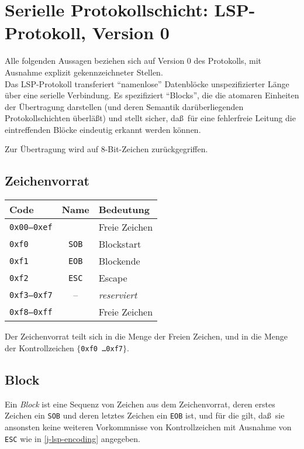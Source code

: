 \chapter{Serielle Protokollschicht: LSP-Protokoll, Version 0}\label{slp-proto}

Alle folgenden Aussagen beziehen sich auf Version 0 des Protokolls, mit Ausnahme
explizit gekennzeichneter Stellen.\\

Das LSP-Protokoll transferiert ``namenlose'' Datenbl\"ocke unspezifizierter
L\"ange \"uber eine serielle Verbindung. Es spezifiziert ``Blocks'', die die
atomaren Einheiten der \"Ubertragung darstellen (und deren Semantik dar\"uberliegenden
Protokollschichten \"uberl\"a\ss t) und stellt sicher, da\ss\ f\"ur eine fehlerfreie
Leitung die eintreffenden Bl\"ocke eindeutig erkannt werden k\"onnen.

Zur \"Ubertragung wird auf 8-Bit-Zeichen zur\"uckgegriffen.

\section{Zeichenvorrat}
\begin{tabular}{l|c|l}
{\bf Code} & {\bf Name} & {\bf Bedeutung} \\
\hline
{\tt 0x00--0xef} & & Freie Zeichen \\
{\tt 0xf0} & {\tt SOB} & Blockstart \\
{\tt 0xf1} & {\tt EOB} & Blockende \\
{\tt 0xf2} & {\tt ESC} & Escape \\
{\tt 0xf3--0xf7} & -- & {\it reserviert} \\
{\tt 0xf8--0xff} & & Freie Zeichen \\
\end{tabular}

Der Zeichenvorrat teilt sich in die Menge der Freien Zeichen, und in
die Menge der Kontrollzeichen $\{${\tt 0xf0 \ldots 0xf7}$\}$.

\section{Block}
Ein {\it Block} ist eine Sequenz von Zeichen aus dem Zeichenvorrat, deren erstes
Zeichen ein {\tt SOB} und deren letztes Zeichen ein {\tt EOB} ist, und f\"ur die
gilt, da\ss\ sie ansonsten keine weiteren Vorkommnisse von Kontrollzeichen mit Ausnahme
von {\tt ESC} wie in \ref{j-lsp-encoding} angegeben.

